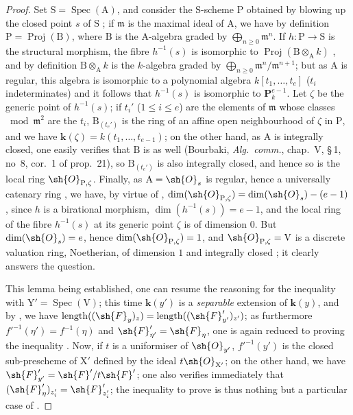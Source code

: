 \begin{proof}
Set $\mathrm{S}=\operatorname{Spec}(\mathrm{A})$, and consider the $\mathrm{S}$-scheme $\mathrm{P}$ obtained by blowing up the closed point $s$ of $\mathrm{S}$ ; if $\mathfrak{m}$ is the maximal ideal of $\mathrm{A}$, we have by definition $\mathrm{P}=\operatorname{Proj}(\mathrm{B})$, where $\mathrm{B}$ is the $\mathrm{A}$-algebra graded by $\bigoplus_{n\geqslant 0}\mathfrak{m}^n$.
If $h:\mathrm{P}\to\mathrm{S}$ is the structural morphism, the fibre $h^{-1}(s)$ is isomorphic to $\operatorname{Proj}(\mathrm{B}\otimes_\mathrm{A} k)$ , and by definition $\mathrm{B}\otimes_\mathrm{A} k$ is the $k$-algebra graded by $\bigoplus_{n\geqslant 0}\mathfrak{m}^n/\mathfrak{m}^{n+1}$; but as $\mathrm{A}$ is regular, this algebra is isomorphic to a polynomial algebra $k[t_1,\ldots,t_e]$ ($t_i$ indeterminates)  and it follows that $h^{-1}(s)$ is isomorphic to $\mathbf{P}_k^{e-1}$.
Let $\zeta$ be the generic point of $h^{-1}(s)$; if $t_i'$ ($1\leqslant i\leqslant e$) are the elements of $\mathfrak{m}$ whose classes $\bmod\mathfrak{m}^2$ are the $t_i$, $\mathrm{B}_{(t_e')}$ is the ring of an affine open neighbourhood of $\zeta$ in $\mathrm{P}$, and we have $\mathbf{k}(\zeta)=k(t_1,\ldots,t_{e-1})$; on the other hand, as $\mathrm{A}$ is integrally closed, one easily verifies that $\mathrm{B}$ is as well (Bourbaki, \emph{Alg.\ comm.}, chap.~V, \S\,1, no~8, cor.~1 of prop.~21), so $\mathrm{B}_{(t_e')}$ is also integrally closed, and hence so is the local ring $\sh{O}_{\mathrm{P},\zeta}$.
Finally, as $\mathrm{A}=\sh{O}_s$ is regular, hence a universally catenary ring , we have, by virtue of , $\dim(\sh{O}_{\mathrm{P},\zeta})=\dim(\sh{O}_s)-(e-1)$, since $h$ is a birational morphism, $\dim(h^{-1}(s))=e-1$, and the local ring of the fibre $h^{-1}(s)$ at its generic point $\zeta$ is of dimension $0$.
But $\dim(\sh{O}_s)=e$, hence $\dim(\sh{O}_{\mathrm{P},\zeta})=1$, and $\sh{O}_{\mathrm{P},\zeta}=\mathrm{V}$ is a discrete valuation ring, Noetherian, of dimension $1$ and integrally closed ; it clearly answers the question.

This lemma being established, one can resume the reasoning for the inequality  with $\mathrm{Y}'=\operatorname{Spec}(\mathrm{V})$; this time $\mathbf{k}(y')$ is a \emph{separable} extension of $\mathbf{k}(y)$, and by , we have $\operatorname{length}((\sh{F}_y)_z)=\operatorname{length}((\sh{F}_{y'}')_{z'})$; as furthermore $f'^{-1}(\eta')=f^{-1}(\eta)$ and $\sh{F}_{\eta'}'=\sh{F}_\eta$, one is again reduced to proving the inequality .
Now, if $t$ is a uniformiser of $\sh{O}_{y'}$, $f'^{-1}(y')$ is the closed sub-prescheme of $\mathrm{X}'$ defined by the ideal $t\sh{O}_{\mathrm{X}'}$; on the other hand, we have $\sh{F}_{y'}'=\sh{F}'/t\sh{F}'$; one also verifies immediately  that $(\sh{F}_\eta')_{z_i'}=\sh{F}_{z_i'}'$; the inequality to prove  is thus nothing but a particular case of .
\end{proof}

